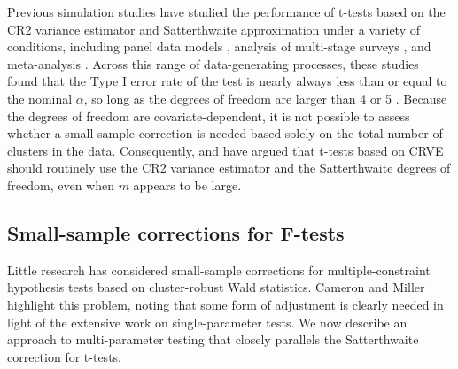 \documentclass[12pt]{article}\usepackage[]{graphicx}\usepackage[]{color}
\newcommand{\bs}{\boldsymbol}
\begin{document}
Previous simulation studies have studied the performance of t-tests based on the CR2 variance estimator and Satterthwaite approximation under a variety of conditions, including panel data models \citep{Cameron2015practitioners, Imbens2015robust}, analysis of multi-stage surveys \citep{Bell2002bias}, and meta-analysis . Across this range of data-generating processes, these studies found that the Type I error rate of the test is nearly always less than or equal to the nominal $\alpha$, so long as the degrees of freedom are larger than 4 or 5 \citep[][]{Bell2002bias}.
Because the degrees of freedom are covariate-dependent, it is not possible to assess whether a small-sample correction is needed based solely on the total number of clusters in the data. 
Consequently,  and \citet{Imbens2015robust} have argued that t-tests based on CRVE should routinely use the CR2 variance estimator and the Satterthwaite degrees of freedom, even when $m$ appears to be large.

\subsection{Small-sample corrections for F-tests}
\label{subsec:F-tests}

Little research has considered small-sample corrections for multiple-constraint hypothesis tests based on cluster-robust Wald statistics.
Cameron and Miller highlight this problem, noting that some form of adjustment is clearly needed in light of the extensive work on single-parameter tests.
We now describe an approach to multi-parameter testing that closely parallels the Satterthwaite correction for t-tests.
\end{document}
